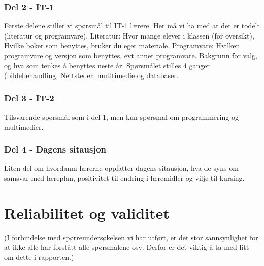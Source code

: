 \subsubsection{Del 2 - IT-1}
{\color{red} Første delene stiller vi spørsmål til IT-1 lærere. Her må vi ha  med at det er todelt (literatur og programvare). Literatur: Hvor mange elever i klassen (for oversikt), Hvilke bøker som benyttes, bruker du eget materiale. 
Programvare: Hvilken programvare og versjon som benyttes, evt annet programvare. Bakgrunn for valg, og hva som tenkes å benyttes neste år. Spørsmålet stilles 4 ganger (bildebehandling, Nettsteder, mutltimedie og databaser. }

\subsubsection{Del 3 - IT-2}
{\color{red} Tilsvarende spørsmål som i del 1, men kun spørsmål om programmering og multimedier.}

\subsubsection{Del 4 - Dagens sitausjon}
{\color{red} Liten del om hvordanm lærerne oppfatter dagens sitausjon, hva de syns om samsvar med læreplan, positivitet til endring i læremidler og vilje til kursing.}





\section{Reliabilitet og validitet}
{ \color {red} (I forbindelse med spørreundersøkelsen vi har utført, er det stor sannsynlighet for at ikke alle har forstått alle spørsmålene osv. Derfor er det viktig å ta med litt om dette i rapporten.)}






